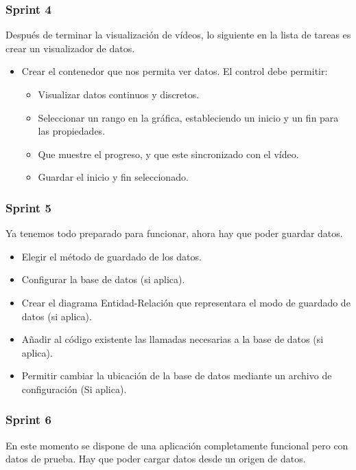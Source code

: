 \subsubsection{Sprint 4}
Despu\'{e}s de terminar la visualizaci\'{o}n de v\'{i}deos, lo siguiente en la lista de tareas es 
crear un visualizador de datos.

\begin{itemize}
    \item Crear el contenedor que nos permita ver datos. El control debe permitir:
    \begin{itemize}
        \item Visualizar datos continuos y discretos.
        \item Seleccionar un rango en la gr\'{a}fica, estableciendo un inicio y un fin para las 
        propiedades.
        \item Que muestre el progreso, y que este sincronizado con el v\'{i}deo.
        \item Guardar el inicio y fin seleccionado.
    \end{itemize}
\end{itemize}

\subsubsection{Sprint 5}
Ya tenemos todo preparado para funcionar, ahora hay que poder guardar datos.

\begin{itemize}
    \item Elegir el m\'etodo de guardado de los datos.
    \item Configurar la base de datos (si aplica).
    \item Crear el diagrama Entidad-Relaci\'{o}n que representara el modo de guardado de datos 
    (si aplica).
    \item A\~{n}adir al c\'{o}digo existente las llamadas necesarias a la base de datos (si 
    aplica).
    \item Permitir cambiar la ubicaci\'{o}n de la base de datos mediante un archivo de 
    configuraci\'{o}n (Si aplica).
\end{itemize}

\subsubsection{Sprint 6}
En este momento se dispone de una aplicaci\'{o}n completamente funcional pero con datos de 
prueba. 
Hay que poder cargar datos desde un origen de datos.

